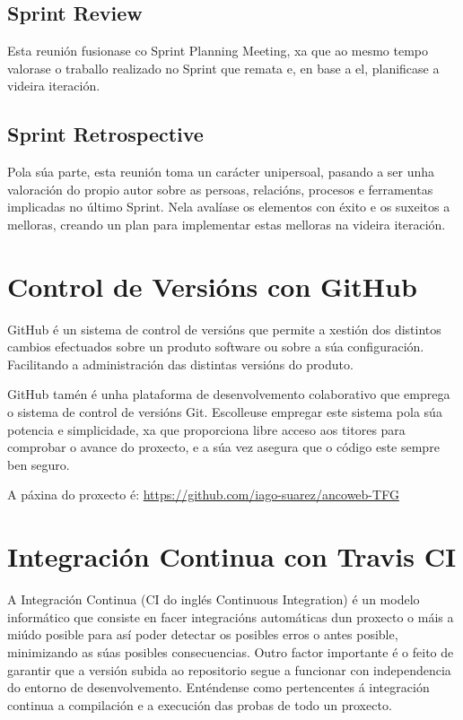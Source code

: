     \subsection{Sprint Review}
        Esta reunión fusionase co Sprint Planning Meeting, xa que ao mesmo tempo valorase o traballo
        realizado no Sprint que remata e, en base a el, planificase a videira iteración. 
    
    \subsection{Sprint Retrospective}
        Pola súa parte, esta reunión toma un carácter unipersoal, pasando a ser unha valoración do
        propio autor sobre as persoas, relacións, procesos e ferramentas implicadas no último Sprint.
        Nela avalíase os elementos con éxito e os suxeitos a melloras, creando un plan para implementar
        estas melloras na videira iteración.

\section{Control de Versións con GitHub}
    GitHub é un sistema de control de versións que permite a xestión dos distintos cambios
    efectuados sobre un produto software ou sobre a súa configuración. Facilitando a administración
    das distintas versións do produto. 
    
    GitHub tamén é unha plataforma de desenvolvemento colaborativo que emprega o sistema de
    control de versións Git. Escolleuse empregar este sistema pola súa potencia e simplicidade, xa
    que proporciona libre acceso aos titores para comprobar o avance do proxecto, e a súa vez asegura
    que o código este sempre ben seguro.
    
    A páxina do proxecto é: \url{https://github.com/iago-suarez/ancoweb-TFG} 
    
\section{Integración Continua con Travis CI}

    A Integración Continua (CI do inglés Continuous Integration) é un modelo informático que 
    consiste en facer integracións automáticas dun proxecto o máis a miúdo posible para así 
    poder detectar os posibles erros o antes posible, minimizando as súas posibles consecuencias.
    Outro factor importante é o feito de garantir que a versión subida ao repositorio segue a
    funcionar con independencia do entorno de desenvolvemento. Enténdense como pertencentes á 
    integración continua a compilación e a execución das probas de todo un proxecto.
    
